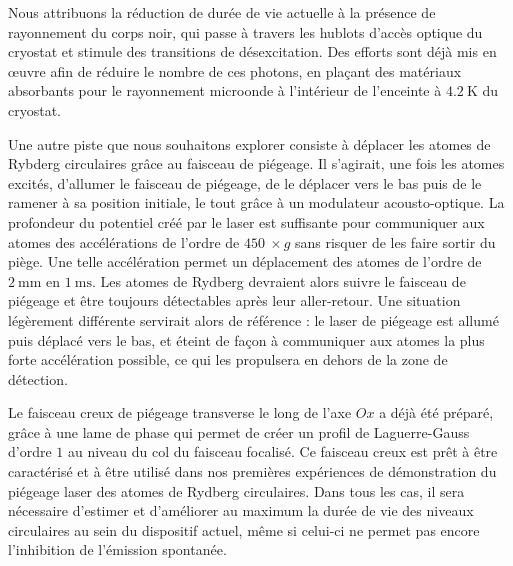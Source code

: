 Nous attribuons la réduction de durée de vie actuelle à la présence de rayonnement du corps noir, qui passe à travers les hublots d'accès optique du cryostat et stimule des transitions de désexcitation.
Des efforts sont déjà mis en \oe uvre afin de réduire le nombre de ces photons, en plaçant des matériaux absorbants pour le rayonnement microonde à l'intérieur de l'enceinte à $\SI{4.2}{\K}$ du cryostat.

Une autre piste que nous souhaitons explorer consiste à déplacer les atomes de Rybderg circulaires grâce au faisceau de piégeage.
Il s'agirait, une fois les atomes excités, d'allumer le faisceau de piégeage, de le déplacer vers le bas puis de le ramener à sa position initiale, le tout grâce à un modulateur acousto-optique.
La profondeur du potentiel créé par le laser est suffisante pour communiquer aux atomes des accélérations de l'ordre de $\SI{450}{}\times g$ sans risquer de les faire sortir du piège.
Une telle accélération permet un déplacement des atomes de l'ordre de $\SI{2}{\mm}$ en $\SI{1}{\ms}$.
Les atomes de Rydberg devraient alors suivre le faisceau de piégeage et être toujours détectables après leur aller-retour.
Une situation légèrement différente servirait alors de référence : le laser de piégeage est allumé puis déplacé vers le bas, et éteint de façon à communiquer aux atomes la plus forte accélération possible, ce qui les propulsera en dehors de la zone de détection.

Le faisceau creux de piégeage transverse le long de l'axe $Ox$ a déjà été préparé, grâce à une lame de phase qui permet de créer un profil de Laguerre-Gauss d'ordre $1$ au niveau du col du faisceau focalisé.
Ce faisceau creux est prêt à être caractérisé et à être utilisé dans nos premières expériences de démonstration du piégeage laser des atomes de Rydberg circulaires.
Dans tous les cas, il sera nécessaire d'estimer et d'améliorer au maximum la durée de vie des niveaux circulaires au sein du dispositif actuel, même si celui-ci ne permet pas encore l'inhibition de l'émission spontanée.


